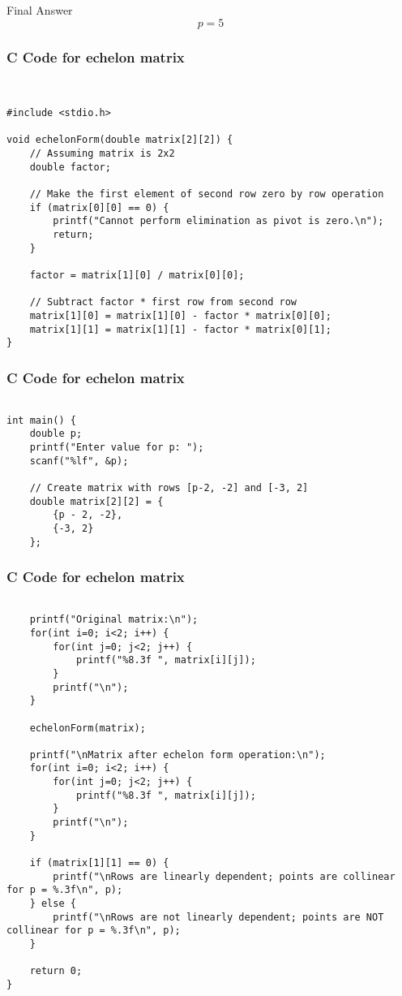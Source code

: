 \documentclass{beamer}
\begin{document}
\begin{frame}{Final Answer}
\[
\boxed{p = 5}
\]
\end{frame}

\begin{frame}[fragile]
    \frametitle{C Code for echelon matrix }

    \begin{lstlisting}
    

#include <stdio.h>

void echelonForm(double matrix[2][2]) {
    // Assuming matrix is 2x2
    double factor;

    // Make the first element of second row zero by row operation
    if (matrix[0][0] == 0) {
        printf("Cannot perform elimination as pivot is zero.\n");
        return;
    }
    
    factor = matrix[1][0] / matrix[0][0];

    // Subtract factor * first row from second row
    matrix[1][0] = matrix[1][0] - factor * matrix[0][0];
    matrix[1][1] = matrix[1][1] - factor * matrix[0][1];
}
\end{lstlisting}
\end{frame}

\begin{frame}[fragile]
    \frametitle{C Code for echelon matrix }

    \begin{lstlisting}

int main() {
    double p;
    printf("Enter value for p: ");
    scanf("%lf", &p);

    // Create matrix with rows [p-2, -2] and [-3, 2]
    double matrix[2][2] = {
        {p - 2, -2},
        {-3, 2}
    };
    \end{lstlisting}
\end{frame}
\begin{frame}[fragile]
    \frametitle{C Code for echelon matrix }

    \begin{lstlisting}

    printf("Original matrix:\n");
    for(int i=0; i<2; i++) {
        for(int j=0; j<2; j++) {
            printf("%8.3f ", matrix[i][j]);
        }
        printf("\n");
    }

    echelonForm(matrix);

    printf("\nMatrix after echelon form operation:\n");
    for(int i=0; i<2; i++) {
        for(int j=0; j<2; j++) {
            printf("%8.3f ", matrix[i][j]);
        }
        printf("\n");
    }

    if (matrix[1][1] == 0) {
        printf("\nRows are linearly dependent; points are collinear for p = %.3f\n", p);
    } else {
        printf("\nRows are not linearly dependent; points are NOT collinear for p = %.3f\n", p);
    }

    return 0;
}

    \end{lstlisting}
\end{frame}
\end{document}
